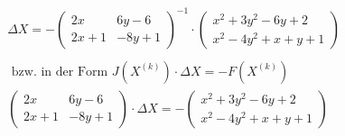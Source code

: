 \begin{align*}
&\Delta X=- \begin{pmatrix}2 x & 6 y - 6 \\ 2 x + 1 & -8 y + 1 \end{pmatrix}^{-1} \cdot \begin{pmatrix}x^2 +3 y^2 - 6 y + 2 \\ x^2 - 4 y^2 + x + y + 1\end{pmatrix}\\\\
&\text{ bzw. in der Form } J (X^{(k)})\cdot \Delta X= -F(X^{(k)})\\
&\begin{pmatrix}2 x & 6 y - 6 \\ 2 x + 1 & -8 y + 1 \end{pmatrix} \cdot \Delta X=-\begin{pmatrix}x^2 +3 y^2 - 6 y + 2 \\ x^2 - 4 y^2 + x + y + 1\end{pmatrix}
\end{align*}
